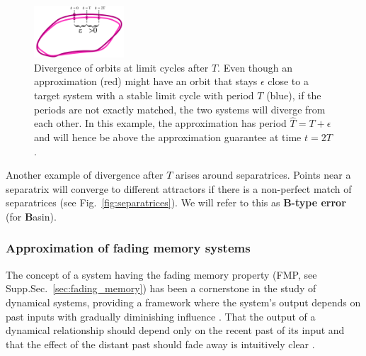 \documentclass{article}
\theoremstyle{definition} \newtheorem{definition}{Definition}
\theoremstyle{remark} \newtheorem{remark}{Remark}
\newcounter{ct}
\begin{document}
\setlength\belowcaptionskip{-5ex}
\begin{figure}
  \centering
  \includegraphics[width=0.3\textwidth]{lc_period_div}
  \caption{Divergence of orbits at limit cycles after $T$.
  Even though an approximation (red) might have an orbit that stays $\epsilon$ close to a target system with a stable limit cycle with period $T$ (blue), if the periods are not exactly matched, the two systems will diverge from each other.
  In this example, the approximation has period $\hat{T} = T+\epsilon$ and will hence be above the approximation guarantee at time $t=2T$.
  }\label{fig:lc_period_div}
\end{figure}

Another example of divergence after $T$ arises around separatrices.
Points near a separatrix will converge to different attractors if there is a non-perfect match of separatrices (see Fig.~\ref{fig:separatrices}).
We will refer to this as \textbf{B-type error} (for \textbf{B}asin).



\subsubsection{Approximation of fading memory systems}\label{sec:fadingmemory}
The concept of a system having the fading memory property (FMP, see Supp.Sec.~\ref{sec:fading_memory}) has been a cornerstone in the study of dynamical systems\citep{coleman1968general}, providing a framework where the system’s output depends on past inputs with gradually diminishing influence \citep{boyd1985fading}.
That the output of a dynamical relationship should depend only on the recent past of its input and that the effect of the distant past should fade away is intuitively clear  \citep{sepulchre2021fading}.
\end{document}
